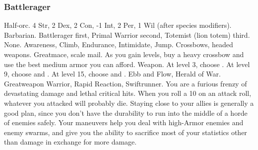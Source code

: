         \subsubsection{Battlerager}
             Half-orc.
             4 Str, 2 Dex, 2 Con, -1 Int, 2 Per, 1 Wil (after species modifiers).
             Barbarian.
             Battlerager first, Primal Warrior second, Totemist (lion totem) third.
             None.
             Awareness, Climb, Endurance, Intimidate, Jump.
             Crossbows, headed weapons.
             Greatmace, scale mail. As you gain levels, buy a heavy crossbow and use the best medium armor you can afford.
             Weapon.
                At level 3, choose .
                At level 9, choose  and .
                At level 15, choose  and .
             Ebb and Flow, Herald of War.
             Greatweapon Warrior, Rapid Reaction, Swiftrunner.
             You are a furious frenzy of devastating damage and lethal critical hits.
            When you roll a 10 on an attack roll, whatever you attacked will probably die.
            Staying close to your allies is generally a good plan, since you don't have the durability to run into the middle of a horde of enemies safely.
            Your maneuvers help you deal with high-Armor enemies and enemy swarms, and give you the ability to sacrifice most of your statistics other than damage in exchange for more damage.

